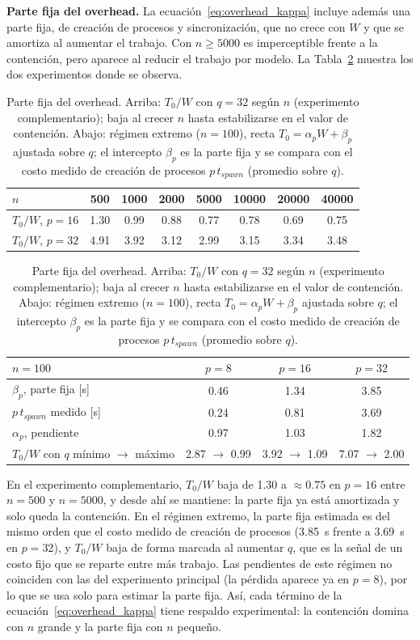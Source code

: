 \documentclass[11pt, a4paper]{article}
\begin{document}
\textbf{Parte fija del overhead.} La ecuación~\eqref{eq:overhead_kappa} incluye además una parte fija, de creación de procesos y sincronización, que no crece con $W$ y que se amortiza al aumentar el trabajo. Con $n \ge 5000$ es imperceptible frente a la contención, pero aparece al reducir el trabajo por modelo. La Tabla~\ref{tab:overhead_fijo} muestra los dos experimentos donde se observa.

\begin{table}[H]
\centering
\small
\caption{Parte fija del overhead. Arriba: $T_0/W$ con $q = 32$ según $n$ (experimento complementario); baja al crecer $n$ hasta estabilizarse en el valor de contención. Abajo: régimen extremo ($n = 100$), recta $T_0 = \alpha_p W + \beta_p$ ajustada sobre $q$; el intercepto $\beta_p$ es la parte fija y se compara con el costo medido de creación de procesos $p\,t_{spawn}$ (promedio sobre $q$).}
\label{tab:overhead_fijo}
\begin{tabular}{lccccccc}
\toprule
$n$ & 500 & 1000 & 2000 & 5000 & 10000 & 20000 & 40000 \\
\midrule
$T_0/W$, $p = 16$ & 1.30 & 0.99 & 0.88 & 0.77 & 0.78 & 0.69 & 0.75 \\
$T_0/W$, $p = 32$ & 4.91 & 3.92 & 3.12 & 2.99 & 3.15 & 3.34 & 3.48 \\
\bottomrule
\end{tabular}

\vspace{0.6em}
\begin{tabular}{lccc}
\toprule
$n = 100$ & $p = 8$ & $p = 16$ & $p = 32$ \\
\midrule
$\beta_p$, parte fija [s]           & 0.46 & 1.34 & 3.85 \\
$p\,t_{spawn}$ medido [s]           & 0.24 & 0.81 & 3.69 \\
$\alpha_p$, pendiente               & 0.97 & 1.03 & 1.82 \\
$T_0/W$ con $q$ mínimo $\to$ máximo & 2.87 $\to$ 0.99 & 3.92 $\to$ 1.09 & 7.07 $\to$ 2.00 \\
\bottomrule
\end{tabular}
\end{table}

En el experimento complementario, $T_0/W$ baja de 1.30 a $\approx 0.75$ en $p = 16$ entre $n = 500$ y $n = 5000$, y desde ahí se mantiene: la parte fija ya está amortizada y solo queda la contención. En el régimen extremo, la parte fija estimada es del mismo orden que el costo medido de creación de procesos (3.85~s frente a 3.69~s en $p = 32$), y $T_0/W$ baja de forma marcada al aumentar $q$, que es la señal de un costo fijo que se reparte entre más trabajo. Las pendientes de este régimen no coinciden con las del experimento principal (la pérdida aparece ya en $p = 8$), por lo que se usa solo para estimar la parte fija. Así, cada término de la ecuación~\eqref{eq:overhead_kappa} tiene respaldo experimental: la contención domina con $n$ grande y la parte fija con $n$ pequeño.
\end{document}
